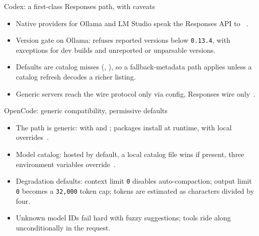 \documentclass[aspectratio=169,11pt]{beamer}
\begin{document}
\begin{frame}{Codex: a first-class Responses path, with caveats}
  \begin{itemize}
    \item Native providers for Ollama and LM Studio speak the Responses
    API to ~\citep{codexRepo}.
    \item Version gate on Ollama: refuses reported versions below
    \texttt{0.13.4}, with exceptions for dev builds and unreported or
    unparsable versions.
    \item Defaults are catalog misses (,
    ), so a fallback-metadata path applies
    unless a catalog refresh decodes a richer listing.
    \item Generic servers reach the wire protocol only via
     config, Responses wire
    only~\citep{codexRepo}.
  \end{itemize}
\end{frame}

\begin{frame}{OpenCode: generic compatibility, permissive defaults}
  \begin{itemize}
    \item The path is generic:  with
     and ; packages install at runtime, with
     local overrides~\citep{opencodeRepo}.
    \item Model catalog: hosted  by default, a
    local catalog file wins if present, three environment variables
    override~\citep{opencodeRepo}.
    \item Degradation defaults: context limit \texttt{0} disables
    auto-compaction; output limit \texttt{0} becomes a \texttt{32,000}
    token cap; tokens are estimated as characters divided by four.
    \item Unknown model IDs fail hard with fuzzy suggestions; tools ride
    along unconditionally in the request.
  \end{itemize}
\end{frame}
\end{document}
